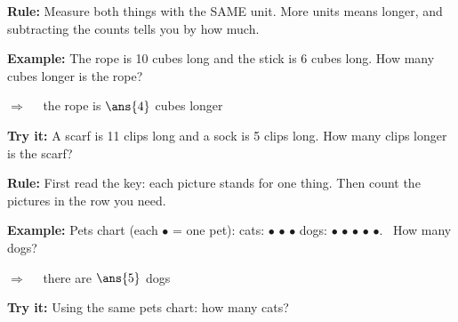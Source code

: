 \documentclass[12pt]{article}
\begin{document}


\begin{formulabox}
\textbf{Rule:} Measure both things with the SAME unit. More units means
longer, and subtracting the counts tells you by how much.
\end{formulabox}

\begin{examplebox}
\textbf{Example:} \quad The rope is 10 cubes long and the stick is 6 cubes
long. How many cubes longer is the rope?

$\Rightarrow\quad$ the rope is $\ans{4}$ cubes longer
\end{examplebox}

\begin{tryitbox}
\textbf{Try it:} \quad A scarf is 11 clips long and a sock is 5 clips long.
How many clips longer is the scarf?\\[2pt]
\end{tryitbox}


\begin{formulabox}
\textbf{Rule:} First read the key: each picture stands for one thing. Then
count the pictures in the row you need.
\end{formulabox}

\begin{examplebox}
\textbf{Example:} \quad Pets chart (each $\bullet$ = one pet): \quad
cats: $\bullet$ $\bullet$ $\bullet$ \quad dogs: $\bullet$ $\bullet$ $\bullet$
$\bullet$ $\bullet$. \ How many dogs?

$\Rightarrow\quad$ there are $\ans{5}$ dogs
\end{examplebox}

\begin{tryitbox}
\textbf{Try it:} \quad Using the same pets chart: how many cats?\\[2pt]
\end{tryitbox}

\end{document}
